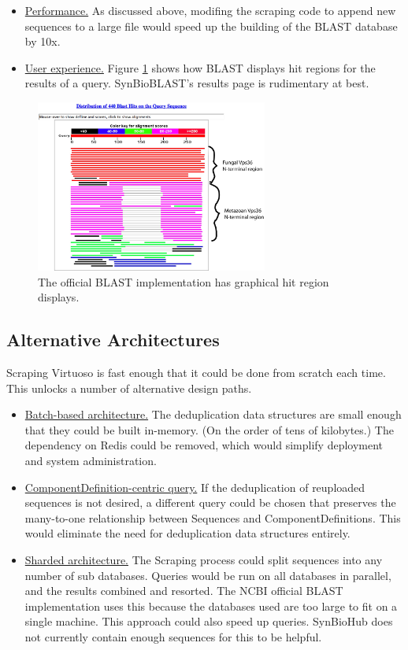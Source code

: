 \documentclass[journal,comsoc]{IEEEtran}
\begin{document}
\begin{itemize}
  \item 
    \underline{Performance.} As discussed above, modifing the scraping code to append new sequences to 
    a large file would speed up the building of the BLAST database by 10x. 
  \item
    \underline{User experience.} Figure \ref{blastexample} shows how BLAST displays
    hit regions for the results of a query. SynBioBLAST's results page is rudimentary
    at best. 
\end{itemize}


\begin{figure}[!t]
\centering
\includegraphics[width=3in]{blastexample.jpg}
\caption{The official BLAST implementation has graphical hit region displays.}
\label{blastexample}
\end{figure}

\subsection{Alternative Architectures}

Scraping Virtuoso is fast enough that it could be done from scratch each time. 
This unlocks a number of alternative design paths.

\begin{itemize}
  \item
    \underline{Batch-based architecture.} The deduplication data structures
    are small enough that they could be built in-memory. (On the order of 
    tens of kilobytes.) The dependency on Redis could be removed, which would
    simplify deployment and system administration.
  \item
    \underline{ComponentDefinition-centric query.} If the deduplication of
    reuploaded sequences is not desired, a different query could be chosen 
    that preserves the many-to-one relationship between Sequences and 
    ComponentDefinitions. This would eliminate the need for deduplication
    data structures entirely.
  \item
    \underline{Sharded architecture.} The Scraping process could split 
    sequences into any number of sub databases. Queries would be run on all
    databases in parallel, and the results combined and resorted. The 
    NCBI official BLAST implementation uses this because the databases used
    are too large to fit on a single machine. This approach could also speed
    up queries. SynBioHub does not currently contain enough sequences for this
    to be helpful. 
\end{itemize}
\end{document}

